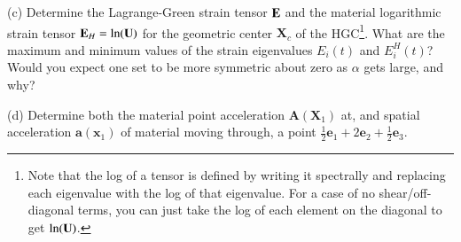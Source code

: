 \medskip
(c) Determine the Lagrange-Green strain tensor $\mathbf{E}$ and the material logarithmic strain tensor $\mathbf{E}_H = \ln (\mathbf{U})$ for the geometric center $\bm{X}_c$ of the HGC\footnote{Note that the log of a tensor is defined by writing it spectrally and replacing each eigenvalue with the log of that eigenvalue. For a case of no shear/off-diagonal terms, you can just take the log of each element on the diagonal to get $\ln(\mathbf{U})$.}. 
What are the maximum and minimum values of the strain eigenvalues $E_i(t)$ and $E_i^H(t)$? 
Would you expect one set to be more symmetric about zero as $\alpha$ gets large, and why?

\medskip
(d) Determine both the material point acceleration $\bm{A}(\bm{X}_1)$ at, and spatial acceleration $\bm{a}(\bm{x}_1)$ of material moving through, a point $\frac{1}{2} \bm{e}_1 + 2\bm{e}_2 + \frac{1}{2} \bm{e}_3$.  



